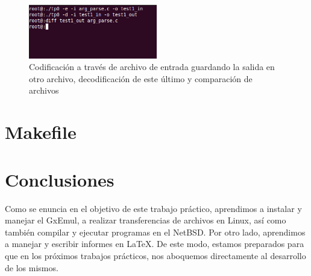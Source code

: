 \documentclass[a4paper,10pt,oneside]{article}
\begin{document}
	\begin{figure}[H]
		\begin{center}
			\includegraphics[width=0.50\textwidth]{test4.png}
		\end{center}
		\caption{Codificación a través de archivo de entrada guardando la salida en otro archivo, decodificación de este último y comparación de archivos} \label{Figura 4}
	\end{figure}
	
	\newpage

\section{Makefile}



\newpage
\section{Conclusiones}	
	Como se enuncia en el objetivo de este trabajo práctico, aprendimos a instalar y manejar el GxEmul, a realizar transferencias de archivos en Linux, así como también compilar y ejecutar programas en el NetBSD. Por otro lado,  aprendimos a manejar y escribir informes en \LaTeX{}.
	De este modo, estamos preparados para que en los próximos trabajos prácticos, nos aboquemos directamente al desarrollo de los mismos.
\end{document}
